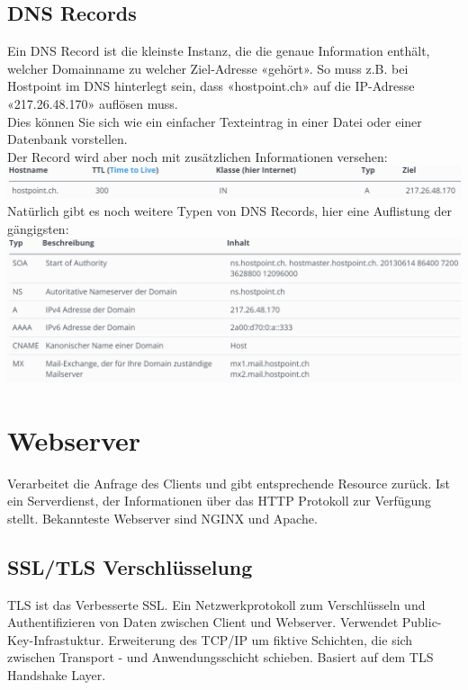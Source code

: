 \documentclass[12pt,a4paper]{article}
\begin{document}
\subsection{DNS Records}
Ein DNS Record ist die kleinste Instanz, die die genaue Information enthält, welcher Domainname zu welcher Ziel-Adresse «gehört». So muss z.B. bei Hostpoint im DNS hinterlegt sein, dass «hostpoint.ch» auf die IP-Adresse «217.26.48.170» auflösen muss.\\
Dies können Sie sich wie ein einfacher Texteintrag in einer Datei oder einer Datenbank vorstellen.\\
Der Record wird aber noch mit zusätzlichen Informationen versehen:\\
\includegraphics[width=\textwidth]{Bilder/dns_record1.PNG}
Natürlich gibt es noch weitere Typen von DNS Records, hier eine Auflistung der gängigsten:\\
\includegraphics[width=\textwidth]{Bilder/dns_record2.PNG}

\section{Webserver}
Verarbeitet die Anfrage des Clients und gibt entsprechende Resource zurück. Ist ein Serverdienst, der Informationen über das HTTP Protokoll zur Verfügung stellt. Bekannteste Webserver sind NGINX und Apache.

\subsection{SSL/TLS Verschlüsselung}
TLS ist das Verbesserte SSL. Ein Netzwerkprotokoll zum Verschlüsseln und Authentifizieren von Daten zwischen Client und Webserver. Verwendet Public-Key-Infrastuktur. Erweiterung des TCP/IP um fiktive Schichten, die sich zwischen Transport - und Anwendungsschicht schieben. Basiert auf dem TLS Handshake Layer.
\end{document}
